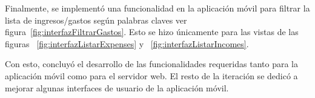 

Finalmente, se implementó una funcionalidad en la aplicación móvil para filtrar la lista de ingresos/gastos según palabras claves ver figura~\ref{fig:interfazFiltrarGastos}. Esto se hizo únicamente para las vistas de las figuras ~\ref{fig:interfazListarExpenses} y ~\ref{fig:interfazListarIncomes}.

Con esto, concluyó el desarrollo de las funcionalidades requeridas tanto para la aplicación móvil como para el servidor web. El resto de la iteración se dedicó a mejorar algunas interfaces de usuario de la aplicación móvil.







